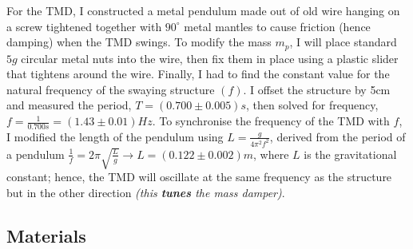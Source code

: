 \documentclass[11pt]{article}
\begin{document}
For the TMD, I constructed a metal pendulum made out of old wire hanging on a screw tightened together with $90^{\circ}$ metal mantles to cause friction (hence damping) when the TMD swings. To modify the mass $m_p$, I will place standard $5g$ circular metal nuts into the wire, then fix them in place using a plastic slider that tightens around the wire. Finally, I had to find the constant value for the natural frequency of the swaying structure $(f)$. I offset the structure by 5cm and measured the period, $T=(0.700\pm 0.005)s$, then solved for frequency,\phantom{.} $f=\frac{1}{0.700s}=(1.43\pm0.01)Hz$. To synchronise the frequency of the TMD with $f$, I modified the length of the pendulum using $L=\frac{g}{4\pi^2f^2}$, derived from the period of a pendulum $\frac{1}{f}=2\pi\sqrt{\frac{L}{g}} \rightarrow L=(0.122\pm0.002)m$, where $L$ is the gravitational constant; hence, the TMD will oscillate at the same frequency as the structure but in the other direction \textit{(this \textbf{tunes} the mass damper)}.

\subsection{Materials}

\end{document}
